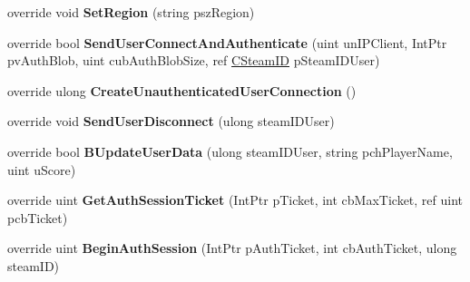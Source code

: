 \begin{DoxyCompactItemize}
\item 
\mbox{\label{class_valve_1_1_steamworks_1_1_c_steam_game_server_aafcfb9c1e8b9c0b817b8db47425150bd}} 
override void {\bfseries Set\+Region} (string psz\+Region)
\item 
\mbox{\label{class_valve_1_1_steamworks_1_1_c_steam_game_server_aae2bab3a191484dfe53a277741c37743}} 
override bool {\bfseries Send\+User\+Connect\+And\+Authenticate} (uint un\+I\+P\+Client, Int\+Ptr pv\+Auth\+Blob, uint cub\+Auth\+Blob\+Size, ref \hyperlink{struct_valve_1_1_steamworks_1_1_c_steam_i_d}{C\+Steam\+ID} p\+Steam\+I\+D\+User)
\item 
\mbox{\label{class_valve_1_1_steamworks_1_1_c_steam_game_server_ae4f67ad0bdda471f148d8683fb3f4384}} 
override ulong {\bfseries Create\+Unauthenticated\+User\+Connection} ()
\item 
\mbox{\label{class_valve_1_1_steamworks_1_1_c_steam_game_server_abf2d557ac1ddb928d9f83a084e745a23}} 
override void {\bfseries Send\+User\+Disconnect} (ulong steam\+I\+D\+User)
\item 
\mbox{\label{class_valve_1_1_steamworks_1_1_c_steam_game_server_a304559f41a202875aa68f7e327115075}} 
override bool {\bfseries B\+Update\+User\+Data} (ulong steam\+I\+D\+User, string pch\+Player\+Name, uint u\+Score)
\item 
\mbox{\label{class_valve_1_1_steamworks_1_1_c_steam_game_server_a08114e7ea43c4beca29a79755b646172}} 
override uint {\bfseries Get\+Auth\+Session\+Ticket} (Int\+Ptr p\+Ticket, int cb\+Max\+Ticket, ref uint pcb\+Ticket)
\item 
\mbox{\label{class_valve_1_1_steamworks_1_1_c_steam_game_server_aa0dd4ea8213125fc28483754061ac9bf}} 
override uint {\bfseries Begin\+Auth\+Session} (Int\+Ptr p\+Auth\+Ticket, int cb\+Auth\+Ticket, ulong steam\+ID)
\item 
\mbox{\label{class_valve_1_1_steamworks_1_1_c_steam_game_server_acf975c6fd92d7d11f7974d5bca7a59a3}} 

\end{DoxyCompactItemize}
